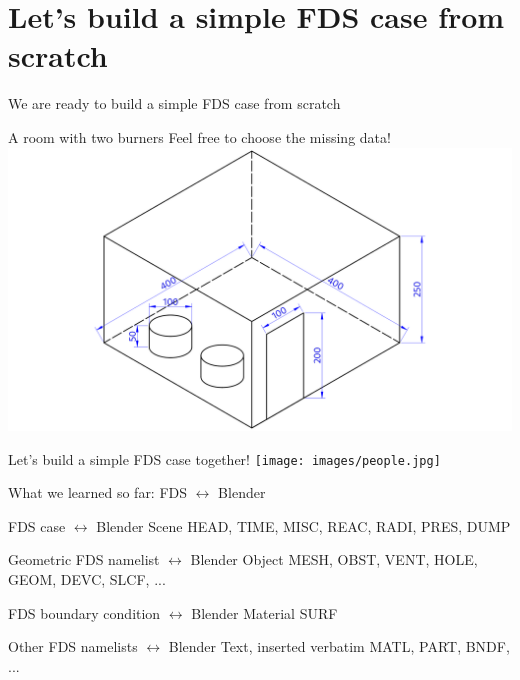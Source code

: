 \documentclass[aspectratio=169]{beamer}
\begin{document}
\section{Let's build a simple FDS case from scratch}
\begin{frame}[fragile]{}
  \centering
  \vfill
  {\fontsize{20}{50}\selectfont We are ready to build \linebreak a simple FDS case from scratch}
  \vfill
\end{frame}

\begin{frame}[fragile]{A room with two burners}
  \vfill
  {\tiny Feel free to choose the missing data!}
  \centering
  \vfill
  \includegraphics[width=.7\linewidth]{images/case.png}
  \vfill
\end{frame}

\begin{frame}[fragile]{}
  \centering
  \vfill
  {\fontsize{20}{50}\selectfont Let's build a simple FDS case}
  \linebreak
  {\fontsize{40}{50}\selectfont together!}
  \centering
  \vfill
  \texttt{[image: images/people.jpg]}
  \vfill
\end{frame}

\begin{frame}[fragile]{What we learned so far: \linebreak FDS $\leftrightarrow$ Blender}
    \begin{vfilleditems}
        \item<1-> FDS case $\leftrightarrow$ Blender Scene
        {\small \linebreak HEAD, TIME, MISC, REAC, RADI, PRES, DUMP}
        \item<2-> Geometric FDS namelist $\leftrightarrow$ Blender Object
        {\small \linebreak MESH, OBST, VENT, HOLE, GEOM, DEVC, SLCF, ...}
        \item<3-> FDS boundary condition $\leftrightarrow$ Blender Material
        {\small \linebreak SURF}
        \item<4-> Other FDS namelists $\leftrightarrow$ Blender Text, inserted verbatim
        {\small \linebreak MATL, PART, BNDF, ...}
    \end{vfilleditems}
\end{frame}
\end{document}
